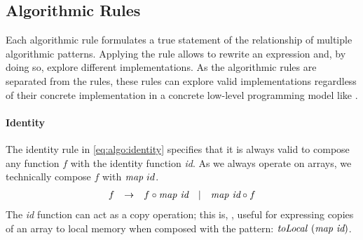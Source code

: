 
\newenvironment{rerule}[1]%
{\begin{equation}\begin{array}{#1}\ignorespaces}%
{\end{array}\end{equation}%
\ignorespacesafterend}

\newenvironment{rerule*}[1]%
{\begin{equation*}\begin{array}{#1}\ignorespaces}%
{\end{array}\end{equation*}%
\ignorespacesafterend}


\newcommand{\comment}[1] {%
\{\text{\small #1}\}%
}

\subsection{Algorithmic Rules}
\label{section:rules:algo}

Each algorithmic rule formulates a true statement of the relationship of multiple algorithmic patterns.
Applying the rule allows to rewrite an expression and, by doing so, explore different implementations.
As the algorithmic rules are separated from the  \OpenCL rules, these rules can explore valid implementations regardless of their concrete implementation in a concrete low-level programming model like \OpenCL.

\paragraph{Identity}
The identity rule in \autoref{eq:algo:identity} specifies that it is always valid to compose any function $f$ with the identity function \emph{id}.
As we always operate on arrays, we technically compose $f$ with $\text{\textit{map}}\ id$.
%
\begin{rerule}{lclcl}
  f & \rightarrow & f \circ \map\ \textit{id} & | & \map\ \textit{id} \circ f
  \label{eq:algo:identity}
\end{rerule}
%
The \textit{id} function can act as a copy operation; this is, \eg, useful for expressing copies of an array to local memory when composed with the \toLocal \OpenCL pattern: $\text{\textit{toLocal}}\ (\text{\textit{map}}\ \textit{id})$.


